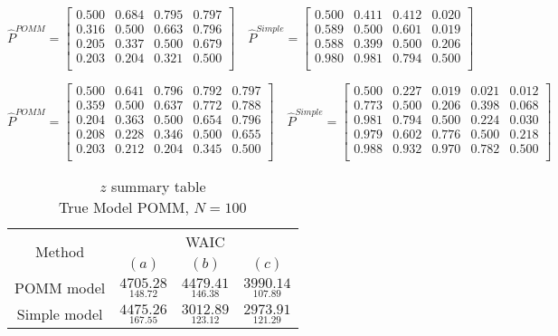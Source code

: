 \documentclass[11pt]{amsart}
\begin{document}
$$\hat{P}^{POMM}=\left[\begin{array}{cccc}
0.500 & 0.684 & 0.795 & 0.797 \\
0.316 & 0.500 & 0.663 & 0.796 \\
0.205 & 0.337 & 0.500 & 0.679 \\
0.203 & 0.204 & 0.321 & 0.500 \\ \end{array}\right] \quad \hat{P}^{Simple}=\left[\begin{array}{cccc}
0.500 & 0.411 & 0.412 & 0.020 \\
0.589 & 0.500 & 0.601 & 0.019 \\
0.588 & 0.399 & 0.500 & 0.206 \\
0.980 & 0.981 & 0.794 & 0.500 \\ \end{array}\right]
$$

$$
\hat{P}^{POMM}= \left[\begin{array}{ccccc}
0.500 & 0.641 & 0.796 & 0.792 & 0.797 \\
0.359 & 0.500 & 0.637 & 0.772 & 0.788 \\
0.204 & 0.363 & 0.500 & 0.654 & 0.796 \\
0.208 & 0.228 & 0.346 & 0.500 & 0.655 \\
0.203 & 0.212 & 0.204 & 0.345 & 0.500 \\
 \end{array}\right] \quad \hat{P}^{Simple}= \left[\begin{array}{ccccc}
0.500 & 0.227 & 0.019 & 0.021 & 0.012 \\
0.773 & 0.500 & 0.206 & 0.398 & 0.068 \\
0.981 & 0.794 & 0.500 & 0.224 & 0.030 \\
0.979 & 0.602 & 0.776 & 0.500 & 0.218 \\
0.988 & 0.932 & 0.970 & 0.782 & 0.500 \\ \end{array}\right]
$$





\begin{table}[htbp]
\centering
\caption*{
{\large $z$ summary table} \\ 
{\small True Model POMM, $N=100$}
} 
\begin{tabular}{cccc}
\toprule
\multirow{2}{*}{Method}  &\multicolumn{3}{c}{WAIC} \\
\cmidrule(lr){2-4}
& $(a)$ & $(b)$ & $(c)$  \\
\midrule
POMM model  &$\underset{148.72}{4705.28}$ & $\underset{146.38}{4479.41}$ & $\underset{107.89}{3990.14}$  \\
Simple model  &$\underset{167.55}{4475.26}$ & $\underset{123.12}{3012.89}$ & $\underset{121.29}{2973.91}$ \\
\bottomrule
\end{tabular}
\label{table:simulations_from_simple}
\end{table}
\end{document}
